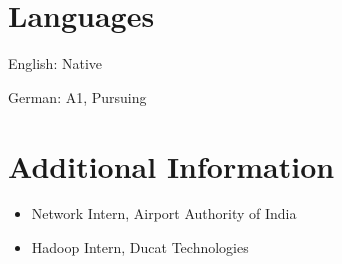 \documentclass[10pt,a4paper]{article}
\begin{document}
\section{Languages}
English: Native\par
German: A1, Pursuing\par

\section{Additional Information}
\begin{itemize}
  \item Network Intern, Airport Authority of India
  \item Hadoop Intern, Ducat Technologies
\end{itemize}
\end{document}
